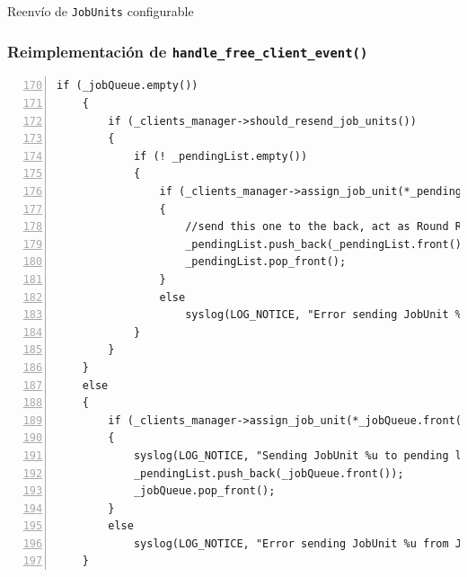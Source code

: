 \begin{subsection}{Reenvío de \texttt{JobUnits} configurable}
	\begin{frame}[fragile]\frametitle{Reimplementación de \texttt{handle\_free\_client\_event()}}
  		\begin{lstlisting}[basicstyle=\tiny, numbers=left, firstnumber=170]
	if (_jobQueue.empty())
	{
	    if (_clients_manager->should_resend_job_units()) 
	    {
	        if (! _pendingList.empty())
	        {
	            if (_clients_manager->assign_job_unit(*_pendingList.front()))
	            {
	                //send this one to the back, act as Round Robin
	                _pendingList.push_back(_pendingList.front());
	                _pendingList.pop_front();
	            }
	            else
	                syslog(LOG_NOTICE, "Error sending JobUnit %u from Pending List to a client.", _pendingList.front()->get_id());
	        }
	    }
	}
	else
	{
	    if (_clients_manager->assign_job_unit(*_jobQueue.front()))
	    {
	        syslog(LOG_NOTICE, "Sending JobUnit %u to pending list.", (_jobQueue.front()->get_id()));
	        _pendingList.push_back(_jobQueue.front());
	        _jobQueue.pop_front();
	    }
	    else
	        syslog(LOG_NOTICE, "Error sending JobUnit %u from Job Queue to a client.", _jobQueue.front()->get_id());
	}	
  		\end{lstlisting}
	\end{frame}
	
\end{subsection}



